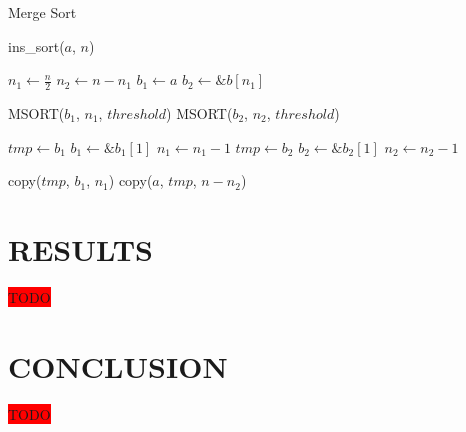 \documentclass[letter, 12pt, conference]{ieeeconf}
\newcommand{\todo}{\colorbox{red}{TODO}}
\begin{document}
\begin{algorithm}[ht]
	\caption{Merge Sort}
	\label{alg:merge_sort}
	\begin{algorithmic}
		\State \Return
		\EndIf

		\State ins\_sort($a$, $n$)
		\State \Return
		\EndIf

		\State $n_{1} \gets \frac{n}{2}$
		\State $n_{2} \gets n - n_{1}$
		\State $b_{1} \gets a$
		\State $b_{2} \gets \&b[n_{1}]$

		\State MSORT($b_{1}$, $n_{1}$, $threshold$)
		\State MSORT($b_{2}$, $n_{2}$, $threshold$)

		\State $tmp \gets b_{1}$
		\State $b_{1} \gets \&b_{1}[1]$
		\State $n_{1} \gets n_{1} - 1$
		\Else
		\State $tmp \gets b_{2}$
		\State $b_{2} \gets \&b_{2}[1]$
		\State $n_{2} \gets n_{2} - 1$
		\EndIf
		\EndWhile

		\State copy($tmp$, $b_{1}$, $n_{1}$)
		\EndIf
		\EndProcedure
		\State copy($a$, $tmp$, $n - n_{2}$)
	\end{algorithmic}
\end{algorithm}

\section{RESULTS}

\todo

\section{CONCLUSION}

\todo



\printbibliography
\end{document}
